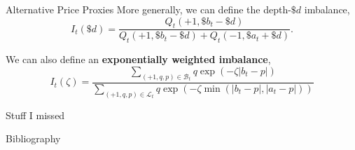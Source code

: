 \documentclass{beamer}
\begin{document}
\begin{frame}{Alternative Price Proxies}
	More generally, we can define the depth-$\$d$ imbalance,
	$$I_t(\$d)=\frac{Q_t(+1,\$b_t-\$d)}{Q_t(+1,\$b_t-\$d)+Q_t(-1,\$a_t+\$d)}.$$%

	\pause

	We can also define an \textbf{exponentially weighted imbalance},
	$$I_t(\zeta) = \frac{\sum_{(+1,q,p)\in\mathcal{B}_t}q\exp(-\zeta\vert b_t-p\vert)}{\sum_{(+1,q,p)\in\mathcal{L}_t}q\exp(-\zeta\min(\vert b_t-p\vert,\vert a_t-p\vert))}$$%
\end{frame}


\begin{frame}{Stuff I missed}

\end{frame}

\begin{frame}{Bibliography}
\end{frame}
\end{document}
